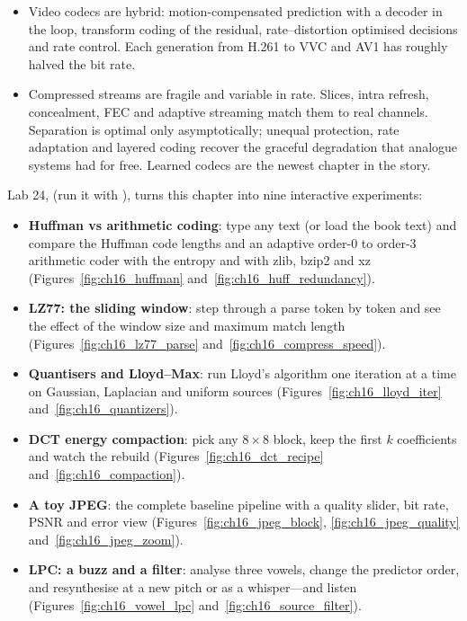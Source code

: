 \begin{itemize}
\item Video codecs are hybrid: motion-compensated prediction with a decoder in the loop, transform coding of
the residual, rate--distortion optimised decisions and rate control. Each generation from H.261 to VVC and AV1
has roughly halved the bit rate.
\item Compressed streams are fragile and variable in rate. Slices, intra refresh, concealment, FEC and
adaptive streaming match them to real channels. Separation is optimal only asymptotically; unequal
protection, rate adaptation and layered coding recover the graceful degradation that analogue systems had
for free. Learned codecs are the newest chapter in the story.
\end{itemize}

\begin{labbox}
Lab 24,  (run it with
), turns this chapter into nine interactive experiments:
\begin{itemize}
\item \textbf{Huffman vs arithmetic coding}: type any text (or load the book text) and compare the
Huffman code lengths and an adaptive order-0 to order-3 arithmetic coder with the entropy and with zlib,
bzip2 and xz (Figures~\ref{fig:ch16_huffman} and~\ref{fig:ch16_huff_redundancy}).
\item \textbf{LZ77: the sliding window}: step through a parse token by token and see the effect of the
window size and maximum match length (Figures~\ref{fig:ch16_lz77_parse} and~\ref{fig:ch16_compress_speed}).
\item \textbf{Quantisers and Lloyd--Max}: run Lloyd's algorithm one iteration at a time on Gaussian,
Laplacian and uniform sources (Figures~\ref{fig:ch16_lloyd_iter} and~\ref{fig:ch16_quantizers}).
\item \textbf{DCT energy compaction}: pick any $8\times8$ block, keep the first $k$ coefficients and watch
the rebuild (Figures~\ref{fig:ch16_dct_recipe} and~\ref{fig:ch16_compaction}).
\item \textbf{A toy JPEG}: the complete baseline pipeline with a quality slider, bit rate, PSNR and error
view (Figures~\ref{fig:ch16_jpeg_block}, \ref{fig:ch16_jpeg_quality} and~\ref{fig:ch16_jpeg_zoom}).
\item \textbf{LPC: a buzz and a filter}: analyse three vowels, change the predictor order, and resynthesise
at a new pitch or as a whisper---and listen (Figures~\ref{fig:ch16_vowel_lpc} and~\ref{fig:ch16_source_filter}).

\end{itemize}
\end{labbox}
